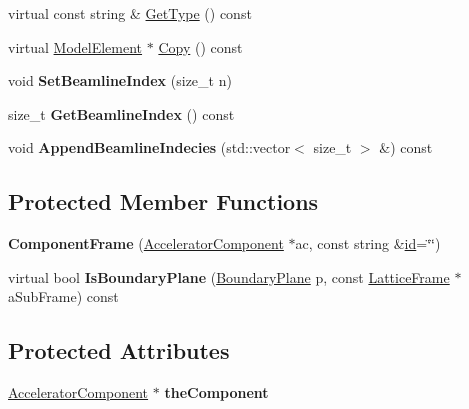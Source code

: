 \begin{DoxyCompactItemize}
\item 
virtual const string \& \hyperlink{classComponentFrame_ab87e0e461ced7eb26a6c58bd1b04cf05}{Get\+Type} () const
\item 
virtual \hyperlink{classModelElement}{Model\+Element} $\ast$ \hyperlink{classComponentFrame_a24f6aea39b57e4b10a764877d1be6b7f}{Copy} () const
\item 
\mbox{\label{classComponentFrame_a433281bac0ba719835fd42cc2b44c06f}} 
void {\bfseries Set\+Beamline\+Index} (size\+\_\+t n)
\item 
\mbox{\label{classComponentFrame_ae1ca4721d618ffb3b8a050cc4d747286}} 
size\+\_\+t {\bfseries Get\+Beamline\+Index} () const
\item 
\mbox{\label{classComponentFrame_a466620bbb459f94c54dee5e0b0c211a1}} 
void {\bfseries Append\+Beamline\+Indecies} (std\+::vector$<$ size\+\_\+t $>$ \&) const
\end{DoxyCompactItemize}
\subsection*{Protected Member Functions}
\begin{DoxyCompactItemize}
\item 
\mbox{\label{classComponentFrame_a93ced219a99cf00a814bd72477add2d1}} 
{\bfseries Component\+Frame} (\hyperlink{classAcceleratorComponent}{Accelerator\+Component} $\ast$ac, const string \&\hyperlink{classModelElement_aada171ead2085c75b592cf07d91bc5c2}{id}=\char`\"{}\char`\"{})
\item 
\mbox{\label{classComponentFrame_abe2f16cb15154490aeb3ec7c25168b0d}} 
virtual bool {\bfseries Is\+Boundary\+Plane} (\hyperlink{classAcceleratorGeometry_a5c1661938176102f235836f5a8be6034}{Boundary\+Plane} p, const \hyperlink{classLatticeFrame}{Lattice\+Frame} $\ast$a\+Sub\+Frame) const
\end{DoxyCompactItemize}
\subsection*{Protected Attributes}
\begin{DoxyCompactItemize}
\item 
\mbox{\label{classComponentFrame_acec711896d0568a381fea3f05066a4a6}} 
\hyperlink{classAcceleratorComponent}{Accelerator\+Component} $\ast$ {\bfseries the\+Component}
\end{DoxyCompactItemize}
